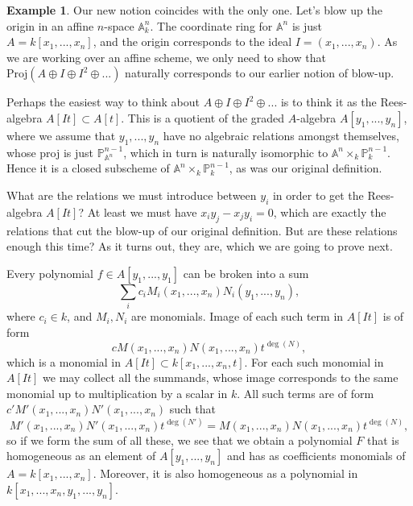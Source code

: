 \documentclass[12pt,a4paper,leqno]{article}
\newcommand{\Aff}{\mathbb{A}}
\newcommand{\Proj}{\mathbb{P}}
\newcommand{\proj}{\mathrm{Proj}}
\theoremstyle{plain}
\theoremstyle{definition}
\newtheorem{ex}[theo]{Example}
\theoremstyle{remark}
\begin{document}
\begin{ex}
Our new notion coincides with the only one. Let's blow up the origin in an affine $n$-space $\Aff_k^n$. The coordinate ring for $\Aff^n$ is just $A = k[x_1,...,x_n]$, and the origin corresponds to the ideal $I = (x_1,...,x_n)$. As we are working over an affine scheme, we only need to show that $\proj (A \oplus I \oplus I^2 \oplus ...)$ naturally corresponds to our earlier notion of blow-up.

Perhaps the easiest way to think about $A \oplus I \oplus I^2 \oplus ...$ is to think it as the Rees-algebra $A[It] \subset A[t]$. This is a quotient of the graded $A$-algebra $A[y_1, ... , y_n]$, where we assume that $y_1,...,y_n$ have no algebraic relations amongst themselves, whose proj is just $\Proj_{\Aff^n}^{n-1}$, which in turn is naturally isomorphic to $\Aff^n \times_k \Proj_k^{n-1}$. Hence it is a closed subscheme of $\Aff^n \times_k \Proj_k^{n-1}$, as was our original definition.

What are the relations we must introduce between $y_i$ in order to get the Rees-algebra $A[It]$? At least we must have $x_i y_j - x_j y_i = 0$, which are exactly the relations that cut the blow-up of our original definition. But are these relations enough this time? As it turns out, they are, which we are going to prove next.

Every polynomial $f \in A[y_1,...,y_1]$ can be broken into a sum
\begin{equation*}
\sum_i c_i M_i(x_1,...,x_n)N_i(y_1,...,y_n),
\end{equation*}
where $c_i \in k$, and $M_i, N_i$ are monomials. Image of each such term in $A[It]$ is of form
\begin{equation*}
c M(x_1,...,x_n)N(x_1,...,x_n)t^{\deg (N)},
\end{equation*}
which is a monomial in $A[It] \subset k[x_1,...,x_n,t]$. For each such monomial in $A[It]$ we may collect all the summands, whose image corresponds to the same monomial up to multiplication by a scalar in $k$. All such terms are of form $c' M'(x_1,...,x_n)N'(x_1,...,x_n)$ such that
\begin{equation*}
M'(x_1,...,x_n)N'(x_1,...,x_n)t^{\deg (N')} = M(x_1,...,x_n)N(x_1,...,x_n)t^{\deg (N)},
\end{equation*}
so if we form the sum of all these, we see that we obtain a polynomial $F$ that is homogeneous as an element of $A[y_1,...,y_n]$ and has as coefficients monomials of $A = k[x_1,...,x_n]$. Moreover, it is also homogeneous as a polynomial in $k[x_1,...,x_n,y_1,...,y_n]$.


\end{ex}
\end{document}
